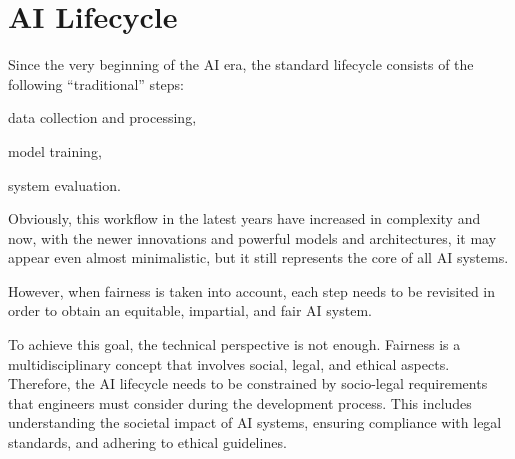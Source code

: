 \documentclass[12pt,a4paper,openright,twoside]{book}
\begin{document}


\section{\acs{AI} Lifecycle}


Since the very beginning of the \ac{AI} era, the standard lifecycle consists of the following ``traditional'' steps:
\begin{enumerate*}[label= (\roman*)]
    \item data collection and processing,
    \item model training,
    \item system evaluation.
\end{enumerate*}
%
Obviously, this workflow in the latest years have increased in complexity and now, with the newer innovations and powerful models and architectures, it may appear even almost minimalistic, but it still represents the core of all \ac{AI} systems.

However, when fairness is taken into account, each step needs to be revisited in order to obtain an equitable, impartial, and fair \ac{AI} system.


To achieve this goal, the technical perspective is not enough. 
Fairness is a multidisciplinary concept that involves social, legal, and ethical aspects.
%
Therefore, the \ac{AI} lifecycle needs to be constrained by socio-legal requirements that engineers must consider during the development process.
%
This includes understanding the societal impact of \ac{AI} systems, ensuring compliance with legal standards, and adhering to ethical guidelines.
\end{document}
